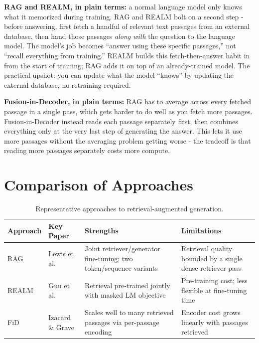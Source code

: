 \documentclass[11pt]{article}
\begin{document}
\textbf{RAG and REALM, in plain terms:} a normal language model only knows what it
memorized during training. RAG and REALM bolt on a second step - before answering,
first fetch a handful of relevant text passages from an external database, then hand
those passages \emph{along with} the question to the language model. The model's job
becomes ``answer using these specific passages,'' not ``recall everything from
training.'' REALM builds this fetch-then-answer habit in from the start of training;
RAG adds it on top of an already-trained model. The practical upshot: you can update
what the model ``knows'' by updating the external database, no retraining required.

\textbf{Fusion-in-Decoder, in plain terms:} RAG has to average across every fetched
passage in a single pass, which gets harder to do well as you fetch more passages.
Fusion-in-Decoder instead reads each passage separately first, then combines
everything only at the very last step of generating the answer. This lets it use more
passages without the averaging problem getting worse - the tradeoff is that reading
more passages separately costs more compute.

\section{Comparison of Approaches}

\begin{table}[h]
\centering
\begin{tabular}{@{}p{2.6cm}p{3.4cm}p{4cm}p{4cm}@{}}
\toprule
\textbf{Approach} & \textbf{Key Paper} & \textbf{Strengths} & \textbf{Limitations} \\
\midrule
RAG & Lewis et al.~\citep{lewis2020rag} & Joint retriever/generator fine-tuning; two token/sequence variants & Retrieval quality bounded by a single dense retriever pass \\
REALM & Guu et al.~\citep{guu2020realm} & Retrieval pre-trained jointly with masked LM objective & Pre-training cost; less flexible at fine-tuning time \\
FiD & Izacard \& Grave~\citep{izacard2021fid} & Scales well to many retrieved passages via per-passage encoding & Encoder cost grows linearly with passages retrieved \\
\bottomrule
\end{tabular}
\caption{Representative approaches to retrieval-augmented generation.}
\end{table}
\end{document}
